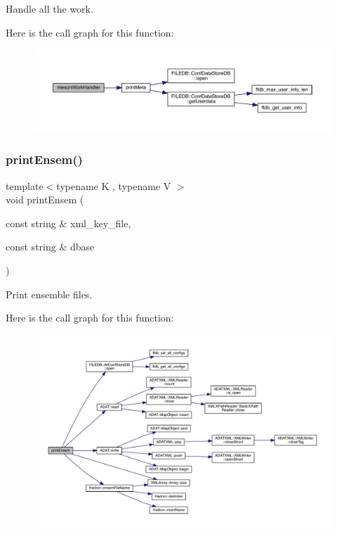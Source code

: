 Handle all the work. 

Here is the call graph for this function\+:
\nopagebreak
\begin{figure}[H]
\begin{center}
\leavevmode
\includegraphics[width=350pt]{d5/d55/adat-devel_2main_2dbutil_2dbutil_8cc_af8b76d6df0ac8bee6ad6ed5d144b2835_cgraph}
\end{center}
\end{figure}
\mbox{\label{adat-devel_2main_2dbutil_2dbutil_8cc_ad3cbb159b8b76eaab3410b4bce843558}} 
\subsubsection{\texorpdfstring{printEnsem()}{printEnsem()}}
{\footnotesize\ttfamily template$<$typename K , typename V $>$ \\
void print\+Ensem (\begin{DoxyParamCaption}\item[{const string \&}]{xml\+\_\+key\+\_\+file,  }\item[{const string \&}]{dbase }\end{DoxyParamCaption})}



Print ensemble files. 

Here is the call graph for this function\+:
\nopagebreak
\begin{figure}[H]
\begin{center}
\leavevmode
\includegraphics[width=350pt]{d5/d55/adat-devel_2main_2dbutil_2dbutil_8cc_ad3cbb159b8b76eaab3410b4bce843558_cgraph}
\end{center}
\end{figure}
\mbox{\label{adat-devel_2main_2dbutil_2dbutil_8cc_a05c6483ffb9fa71112b451a5dd7eb935}} 
